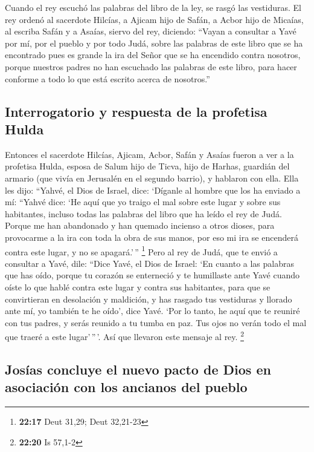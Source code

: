  Cuando el rey escuchó las palabras del libro de la ley,
se rasgó las vestiduras.  El rey ordenó al sacerdote
Hilcías, a Ajicam hijo de Safán, a Acbor hijo de Micaías, al escriba
Safán y a Asaías, siervo del rey, diciendo:  ``Vayan a
consultar a Yavé por mí, por el pueblo y por todo Judá, sobre las
palabras de este libro que se ha encontrado pues es grande la ira del
Señor que se ha encendido contra nosotros, porque nuestros padres no han
escuchado las palabras de este libro, para hacer conforme a todo lo que
está escrito acerca de nosotros.''

\hypertarget{interrogatorio-y-respuesta-de-la-profetisa-hulda}{%
\subsection{Interrogatorio y respuesta de la profetisa
Hulda}\label{interrogatorio-y-respuesta-de-la-profetisa-hulda}}

 Entonces el sacerdote Hilcías, Ajicam, Acbor, Safán y
Asaías fueron a ver a la profetisa Hulda, esposa de Salum hijo de Ticva,
hijo de Harhas, guardián del armario (que vivía en Jerusalén en el
segundo barrio), y hablaron con ella.  Ella les dijo:
``Yahvé, el Dios de Israel, dice: `Díganle al hombre que los ha enviado
a mí:  ``Yahvé dice: `He aquí que yo traigo el mal sobre
este lugar y sobre sus habitantes, incluso todas las palabras del libro
que ha leído el rey de Judá.  Porque me han abandonado y
han quemado incienso a otros dioses, para provocarme a la ira con toda
la obra de sus manos, por eso mi ira se encenderá contra este lugar, y
no se apagará.'\,'' \footnote{\textbf{22:17} Deut 31,29; Deut 32,21-23}
 Pero al rey de Judá, que te envió a consultar a Yavé,
dile: ``Dice Yavé, el Dios de Israel: `En cuanto a las palabras que has
oído,  porque tu corazón se enterneció y te humillaste
ante Yavé cuando oíste lo que hablé contra este lugar y contra sus
habitantes, para que se convirtieran en desolación y maldición, y has
rasgado tus vestiduras y llorado ante mí, yo también te he oído', dice
Yavé.  `Por lo tanto, he aquí que te reuniré con tus
padres, y serás reunido a tu tumba en paz. Tus ojos no verán todo el mal
que traeré a este lugar'\,''\,'. Así que llevaron este mensaje al rey.
\footnote{\textbf{22:20} Is 57,1-2}

\hypertarget{josuxedas-concluye-el-nuevo-pacto-de-dios-en-asociaciuxf3n-con-los-ancianos-del-pueblo}{%
\subsection{Josías concluye el nuevo pacto de Dios en asociación con los
ancianos del
pueblo}\label{josuxedas-concluye-el-nuevo-pacto-de-dios-en-asociaciuxf3n-con-los-ancianos-del-pueblo}}


